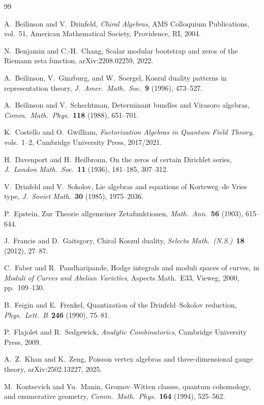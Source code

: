 \documentclass[11pt,reqno]{amsart}
\theoremstyle{definition}
\theoremstyle{remark}
\numberwithin{equation}{section}
\begin{document}
\begin{thebibliography}{99}

A.~Beilinson and V.~Drinfeld,
\textit{Chiral Algebras},
AMS Colloquium Publications, vol.~51,
American Mathematical Society, Providence, RI, 2004.

N.~Benjamin and C.-H.~Chang,
Scalar modular bootstrap and zeros of the Riemann zeta function,
arXiv:2208.02259, 2022.

A.~Beilinson, V.~Ginzburg, and W.~Soergel,
Koszul duality patterns in representation theory,
\textit{J.~Amer.\ Math.\ Soc.}~\textbf{9} (1996), 473--527.

A.~Beilinson and V.~Schechtman,
Determinant bundles and Virasoro algebras,
\textit{Comm.\ Math.\ Phys.}~\textbf{118} (1988), 651--701.

K.~Costello and O.~Gwilliam,
\textit{Factorization Algebras in Quantum Field Theory},
vols.~1--2, Cambridge University Press, 2017/2021.

H.~Davenport and H.~Heilbronn,
On the zeros of certain Dirichlet series,
\textit{J.~London Math.\ Soc.}~\textbf{11} (1936), 181--185,
307--312.

V.~Drinfeld and V.~Sokolov,
Lie algebras and equations of Korteweg--de Vries type,
\textit{J.~Soviet Math.}~\textbf{30} (1985), 1975--2036.

P.~Epstein,
Zur Theorie allgemeiner Zetafunktionen,
\textit{Math.\ Ann.}~\textbf{56} (1903), 615--644.

J.~Francis and D.~Gaitsgory,
Chiral Koszul duality,
\textit{Selecta Math.\ (N.S.)}~\textbf{18} (2012), 27--87.

C.~Faber and R.~Pandharipande,
Hodge integrals and moduli spaces of curves,
in \textit{Moduli of Curves and Abelian Varieties},
Aspects Math.~E33, Vieweg, 2000, pp.~109--130.

B.~Feigin and E.~Frenkel,
Quantization of the Drinfeld--Sokolov reduction,
\textit{Phys.\ Lett.\ B}~\textbf{246} (1990), 75--81.

P.~Flajolet and R.~Sedgewick,
\textit{Analytic Combinatorics},
Cambridge University Press, 2009.

A.~Z.~Khan and K.~Zeng,
Poisson vertex algebras and three-dimensional gauge theory,
arXiv:2502.13227, 2025.

M.~Kontsevich and Yu.~Manin,
Gromov--Witten classes, quantum cohomology, and enumerative geometry,
\textit{Comm.\ Math.\ Phys.}~\textbf{164} (1994), 525--562.


\end{thebibliography}
\end{document}
